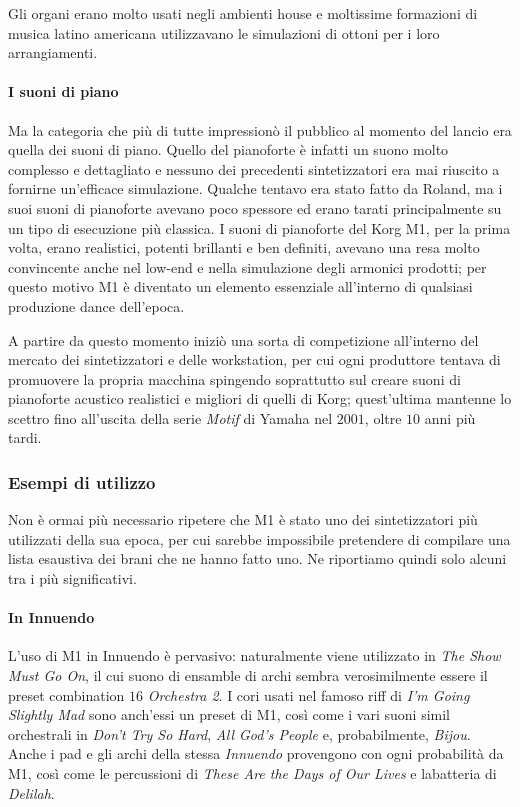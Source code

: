 \documentclass[12pt]{article}
\begin{document}
Gli organi erano molto usati negli ambienti house e moltissime formazioni di musica latino americana utilizzavano le simulazioni di ottoni per i loro arrangiamenti.

\paragraph{I suoni di piano}
Ma la categoria che più di tutte impressionò il pubblico al momento del lancio era quella dei suoni di piano. Quello del pianoforte è infatti un suono molto complesso e dettagliato e nessuno dei precedenti sintetizzatori era mai riuscito a fornirne un'efficace simulazione. Qualche tentavo era stato fatto da Roland, ma i suoi suoni di pianoforte avevano poco spessore ed erano tarati principalmente su un tipo di esecuzione più classica. I suoni di pianoforte del Korg M1, per la prima volta, erano realistici, potenti brillanti e ben definiti, avevano una resa molto convincente anche nel low-end e nella simulazione degli armonici prodotti; per questo motivo M1 è diventato un elemento essenziale all'interno di qualsiasi produzione dance dell'epoca.

A partire da questo momento iniziò una sorta di competizione all'interno del mercato dei sintetizzatori e delle workstation, per cui ogni produttore tentava di promuovere la propria macchina spingendo soprattutto sul creare suoni di pianoforte acustico realistici e migliori di quelli di Korg; quest'ultima mantenne lo scettro fino all'uscita della serie \emph{Motif} di Yamaha nel \(2001\), oltre \(10\) anni più tardi.

\subsubsection{Esempi di utilizzo}
Non è ormai più necessario ripetere che M1 è stato uno dei sintetizzatori più utilizzati della sua epoca, per cui sarebbe impossibile pretendere di compilare una lista esaustiva dei brani che ne hanno fatto uno. Ne riportiamo quindi solo alcuni tra i più significativi.

\paragraph{In Innuendo}
L'uso di M1 in Innuendo è pervasivo: naturalmente viene utilizzato in \emph{The Show Must Go On}, il cui suono di ensamble di archi sembra verosimilmente essere il preset combination \(16\) \emph{Orchestra 2}. I cori usati nel famoso riff di \emph{I'm Going Slightly Mad} sono anch'essi un preset di M1, così come i vari suoni simil orchestrali in \emph{Don't Try So Hard}, \emph{All God's People} e, probabilmente, \emph{Bijou}. Anche i pad e gli archi della stessa \emph{Innuendo} provengono con ogni probabilità da M1, così come le percussioni di \emph{These Are the Days of Our Lives} e labatteria di \emph{Delilah}.
\end{document}
